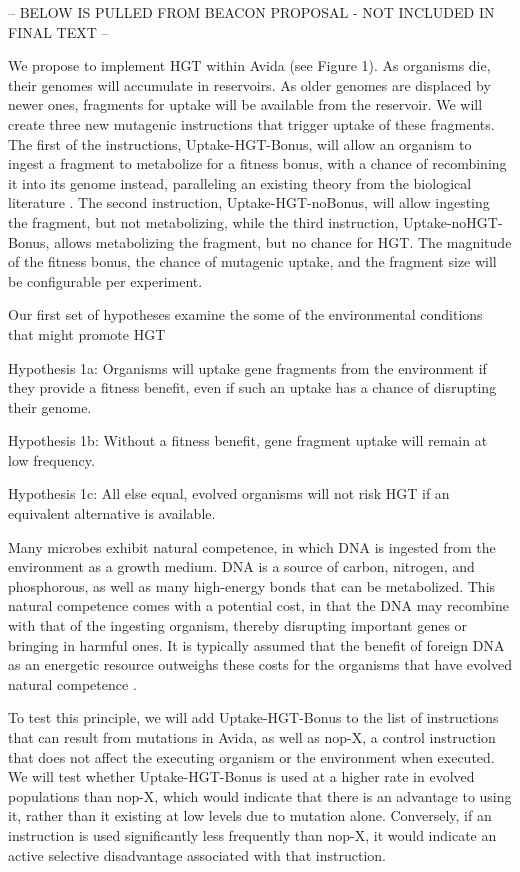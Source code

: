 \begin{mdframed}
-- BELOW IS PULLED FROM BEACON PROPOSAL - NOT INCLUDED IN FINAL TEXT --


We propose to implement HGT within Avida (see Figure 1). As organisms die, their genomes will accumulate in reservoirs. As older genomes are displaced by newer ones, fragments for uptake will be available from the reservoir. We will create three new mutagenic instructions that trigger uptake of these fragments. The first of the instructions, Uptake-HGT-Bonus, will allow an organism to ingest a fragment to metabolize for a fitness bonus, with a chance of recombining it into its genome instead, paralleling an existing theory from the biological literature \cite{Redfield2001}. The second instruction, Uptake-HGT-noBonus, will allow ingesting the fragment, but not metabolizing, while the third instruction, Uptake-noHGT-Bonus, allows metabolizing the fragment, but no chance for HGT. The magnitude of the fitness bonus, the chance of mutagenic uptake, and the fragment size will be configurable per experiment. 

Our first set of hypotheses examine the some of the environmental conditions that might promote HGT 

Hypothesis 1a: Organisms will uptake gene fragments from the environment if they provide a fitness benefit, even if such an uptake has a chance of disrupting their genome. 

Hypothesis 1b: Without a fitness benefit, gene fragment uptake will remain at low frequency. 

Hypothesis 1c: All else equal, evolved organisms will not risk HGT if an equivalent alternative is available. 

Many microbes exhibit natural competence, in which DNA is ingested from the environment as a growth medium. DNA is a source of carbon, nitrogen, and phosphorous, as well as many high-energy bonds that can be metabolized. This natural competence comes with a potential cost, in that the DNA may recombine with that of the ingesting organism, thereby disrupting important genes or bringing in harmful ones. It is typically assumed that the benefit of foreign DNA as an energetic resource outweighs these costs for the organisms that have evolved natural competence \cite{Redfield2001}. 

To test this principle, we will add Uptake-HGT-Bonus to the list of instructions that can result from mutations in Avida, as well as nop-X, a control instruction that does not affect the executing organism or the environment when executed. We will test whether Uptake-HGT-Bonus is used at a higher rate in evolved populations than nop-X, which would indicate that there is an advantage to using it, rather than it existing at low levels due to mutation alone. Conversely, if an instruction is used significantly less frequently than nop-X, it would indicate an active selective disadvantage associated with that instruction. 


\end{mdframed}
